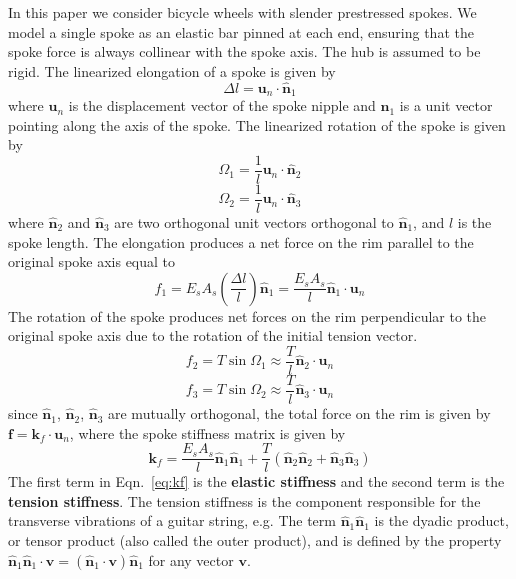 \documentclass{bmd2016p}
\newcommand{\n}{\ensuremath{\hat{\bm{n}}_1}}
\newcommand{\nn}{\ensuremath{\hat{\bm{n}}_2}}
\newcommand{\nnn}{\ensuremath{\hat{\bm{n}}_3}}
\begin{document}
In this paper we consider bicycle wheels with slender prestressed spokes. We model a single spoke as an elastic bar pinned at each end, ensuring that the spoke force is always collinear with the spoke axis. The hub is assumed to be rigid. The linearized elongation of a spoke is given by
	\begin{equation}\label{eq:selong}
	\Delta l = \bm{u}_n\cdot \n
	\end{equation}
where $\bm{u}_n$ is the displacement vector of the spoke nipple and \n{} is a unit vector pointing along the axis of the spoke. The linearized rotation of the spoke is given by
	\begin{equation}\label{eq:srot1}
	\Omega_1 = \frac{1}{l} \bm{u}_n\cdot \nn
	\end{equation}
	\begin{equation}\label{eq:srot2}
	\Omega_2 = \frac{1}{l} \bm{u}_n\cdot \nnn
	\end{equation}
where \nn{} and \nnn{} are two orthogonal unit vectors orthogonal to \n{}, and $l$ is the spoke length. The elongation produces a net force on the rim parallel to the original spoke axis equal to
	\begin{equation}\label{eq:sF1}
	f_1 = E_sA_s\left(\frac{\Delta l}{l}\right)\n = \frac{E_sA_s}{l} \n \cdot \bm{u}_n 
	\end{equation}
The rotation of the spoke produces net forces on the rim perpendicular to the original spoke axis due to the rotation of the initial tension vector.
	\begin{equation}\label{eq:sF2}
	f_2 = T \sin{\Omega_1} \approx \frac{T}{l} \nn \cdot \bm{u}_n
	\end{equation}
	\begin{equation}\label{eq:sF3}
	f_3 = T \sin{\Omega_2} \approx \frac{T}{l} \nnn \cdot \bm{u}_n
	\end{equation}
since \n{}, \nn{}, \nnn{} are mutually orthogonal, the total force on the rim is given by $\bm{f} = \bm{k}_f \cdot \bm{u}_n$, where the spoke stiffness matrix is given by
	\begin{equation}\label{eq:kf}
	\bm{k}_f = \frac{E_sA_s}{l}\n\n + \frac{T}{l}(\nn\nn + \nnn\nnn)
	\end{equation}
The first term in Eqn.~\ref{eq:kf} is the {\bf elastic stiffness} and the second term is the {\bf tension stiffness}. The tension stiffness is the component responsible for the transverse vibrations of a guitar string, e.g. The term $\n\n$ is the dyadic product, or tensor product (also called the outer product), and is defined by the property $\n\n\cdot \bm{v} = (\n\cdot \bm{v})\n$ for any vector $\bm{v}$.
\end{document}
